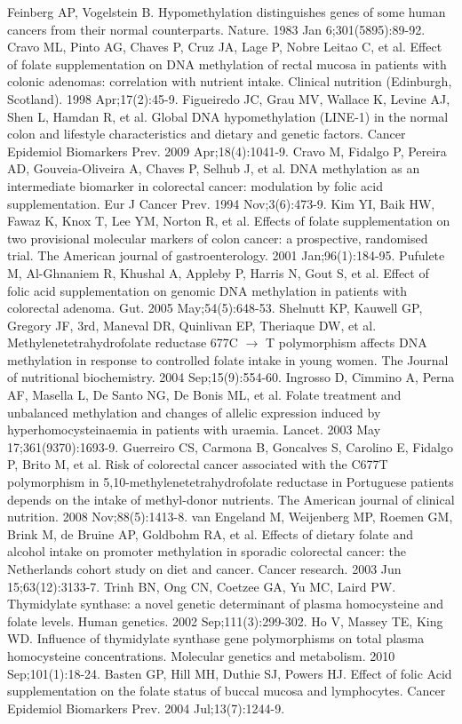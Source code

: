 \begin{thebibliography}{12}
		Feinberg AP, Vogelstein B. Hypomethylation distinguishes genes of some human cancers from their normal counterparts. Nature. 1983 Jan 6;301(5895):89-92. 
		Cravo ML, Pinto AG, Chaves P, Cruz JA, Lage P, Nobre Leitao C, et al. Effect of folate supplementation on DNA methylation of rectal mucosa in patients with colonic adenomas: correlation with nutrient intake. Clinical nutrition (Edinburgh, Scotland). 1998 Apr;17(2):45-9. 
		Figueiredo JC, Grau MV, Wallace K, Levine AJ, Shen L, Hamdan R, et al. Global DNA hypomethylation (LINE-1) in the normal colon and lifestyle characteristics and dietary and genetic factors. Cancer Epidemiol Biomarkers Prev. 2009 Apr;18(4):1041-9. 
		Cravo M, Fidalgo P, Pereira AD, Gouveia-Oliveira A, Chaves P, Selhub J, et al. DNA methylation as an intermediate biomarker in colorectal cancer: modulation by folic acid supplementation. Eur J Cancer Prev. 1994 Nov;3(6):473-9. 
		Kim YI, Baik HW, Fawaz K, Knox T, Lee YM, Norton R, et al. Effects of folate supplementation on two provisional molecular markers of colon cancer: a prospective, randomised trial. The American journal of gastroenterology. 2001 Jan;96(1):184-95. 
		Pufulete M, Al-Ghnaniem R, Khushal A, Appleby P, Harris N, Gout S, et al. Effect of folic acid supplementation on genomic DNA methylation in patients with colorectal adenoma. Gut. 2005 May;54(5):648-53. 
		Shelnutt KP, Kauwell GP, Gregory JF, 3rd, Maneval DR, Quinlivan EP, Theriaque DW, et al. Methylenetetrahydrofolate reductase 677C $\rightarrow$ T polymorphism affects DNA methylation in response to controlled folate intake in young women. The Journal of nutritional biochemistry. 2004 Sep;15(9):554-60. 
		Ingrosso D, Cimmino A, Perna AF, Masella L, De Santo NG, De Bonis ML, et al. Folate treatment and unbalanced methylation and changes of allelic expression induced by hyperhomocysteinaemia in patients with uraemia. Lancet. 2003 May 17;361(9370):1693-9. 
		Guerreiro CS, Carmona B, Goncalves S, Carolino E, Fidalgo P, Brito M, et al. Risk of colorectal cancer associated with the C677T polymorphism in 5,10-methylenetetrahydrofolate reductase in Portuguese patients depends on the intake of methyl-donor nutrients. The American journal of clinical nutrition. 2008 Nov;88(5):1413-8. 
		van Engeland M, Weijenberg MP, Roemen GM, Brink M, de Bruine AP, Goldbohm RA, et al. Effects of dietary folate and alcohol intake on promoter methylation in sporadic colorectal cancer: the Netherlands cohort study on diet and cancer. Cancer research. 2003 Jun 15;63(12):3133-7. 
		Trinh BN, Ong CN, Coetzee GA, Yu MC, Laird PW. Thymidylate synthase: a novel genetic determinant of plasma homocysteine and folate levels. Human genetics. 2002 Sep;111(3):299-302. 
		Ho V, Massey TE, King WD. Influence of thymidylate synthase gene polymorphisms on total plasma homocysteine concentrations. Molecular genetics and metabolism. 2010 Sep;101(1):18-24. 
		Basten GP, Hill MH, Duthie SJ, Powers HJ. Effect of folic Acid supplementation on the folate status of buccal mucosa and lymphocytes. Cancer Epidemiol Biomarkers Prev. 2004 Jul;13(7):1244-9. 
\end{thebibliography} 
